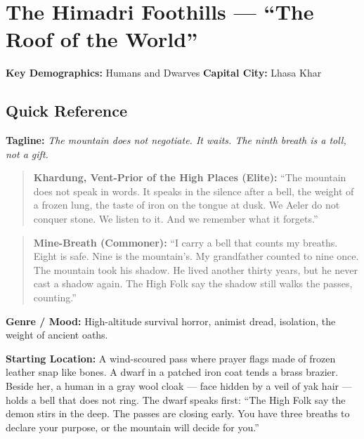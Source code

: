 \section{The Himadri Foothills --- ``The Roof of the World''}
\label{chap:himadri}

\textbf{Key Demographics: } Humans and Dwarves
\textbf{Capital City: } Lhasa Khar

\subsection*{Quick Reference}
\textbf{Tagline:} \textit{The mountain does not negotiate. It waits. The ninth breath is a toll, not a gift.}

\begin{quote}
  \textbf{Khardung, Vent-Prior of the High Places (Elite):}
  ``The mountain does not speak in words. It speaks in the silence after a bell, the weight of a frozen lung, the taste of iron on the tongue at dusk. We Aeler do not conquer stone. We listen to it. And we remember what it forgets.''
\end{quote}

\begin{quote}
  \textbf{Mine-Breath (Commoner):}
  ``I carry a bell that counts my breaths. Eight is safe. Nine is the mountain's. My grandfather counted to nine once. The mountain took his shadow. He lived another thirty years, but he never cast a shadow again. The High Folk say the shadow still walks the passes, counting.''
\end{quote}

\textbf{Genre / Mood:} High-altitude survival horror, animist dread, isolation, the weight of ancient oaths.

\textbf{Starting Location:} A wind-scoured pass where prayer flags made of frozen leather snap like bones. A dwarf in a patched iron coat tends a brass brazier. Beside her, a human in a gray wool cloak --- face hidden by a veil of yak hair --- holds a bell that does not ring. The dwarf speaks first: ``The High Folk say the demon stirs in the deep. The passes are closing early. You have three breaths to declare your purpose, or the mountain will decide for you.''

